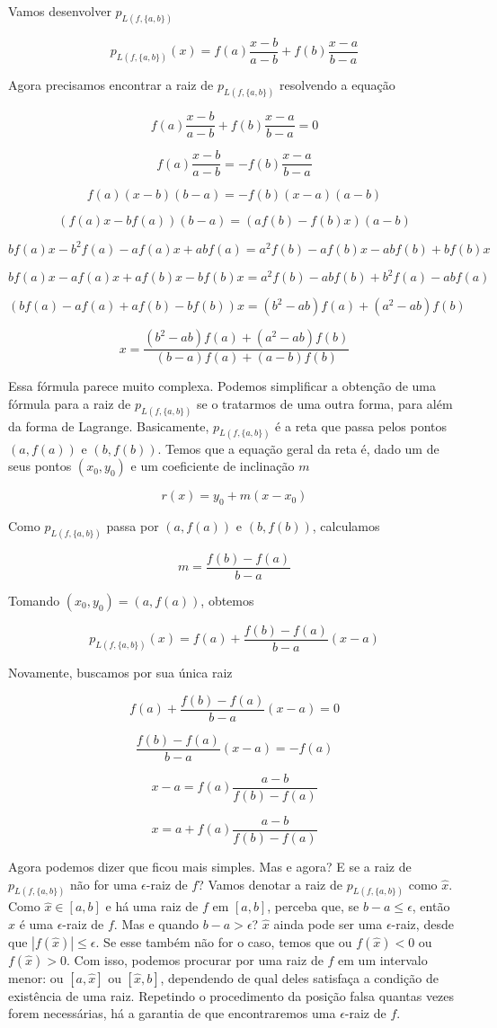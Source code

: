 \documentclass[]{article}
\numberwithin{equation}{section}
\begin{document}
Vamos desenvolver $p_{L(f, \{a, b\})}$

$$
p_{L(f, \{a, b\})}(x) = f(a) \frac{x - b}{a - b} + f(b) \frac{x - a}{b - a}
$$

Agora precisamos encontrar a raiz de $p_{L(f, \{a, b\})}$ resolvendo a
equação

$$
f(a) \frac{x - b}{a - b} + f(b) \frac{x - a}{b - a} = 0
$$

$$
f(a) \frac{x - b}{a - b} = -f(b) \frac{x - a}{b - a}
$$

$$
f(a)(x - b)(b - a) = -f(b)(x - a)(a - b)
$$

$$
(f(a)x - bf(a))(b - a) = (af(b) - f(b)x)(a - b)
$$

$$
bf(a)x - b^2f(a) - af(a)x + abf(a) = a^2f(b) - af(b)x - abf(b) + bf(b)x
$$

$$
bf(a)x - af(a)x + af(b)x - bf(b)x = a^2f(b) - abf(b) + b^2f(a) - abf(a)
$$

$$
(bf(a) - af(a) + af(b) - bf(b))x = (b^2 - ab)f(a) + (a^2 - ab)f(b)
$$

$$
x = \frac{(b^2 - ab)f(a) + (a^2 - ab)f(b)}{(b - a)f(a) + (a - b)f(b)}
$$

Essa fórmula parece muito complexa. Podemos simplificar a obtenção de
uma fórmula para a raiz de $p_{L(f, \{a, b\})}$ se o tratarmos de uma
outra forma, para além da forma de Lagrange. Basicamente,
$p_{L(f, \{a, b\})}$ é a reta que passa pelos pontos $(a, f(a))$ e
$(b, f(b))$. Temos que a equação geral da reta é, dado um de seus
pontos $(x_0, y_0)$ e um coeficiente de inclinação $m$

$$
r(x) = y_0 + m(x - x_0)
$$

Como $p_{L(f, \{a, b\})}$ passa por $(a, f(a))$ e $(b, f(b))$,
calculamos

$$
m = \frac{f(b) - f(a)}{b - a}
$$

Tomando $(x_0, y_0) = (a, f(a))$, obtemos

$$
p_{L(f, \{a, b\})}(x) = f(a) + \frac{f(b) - f(a)}{b - a}(x - a)
$$

Novamente, buscamos por sua única raiz

$$
f(a) + \frac{f(b) - f(a)}{b - a}(x - a) = 0
$$

$$
\frac{f(b) - f(a)}{b - a}(x - a) = -f(a)
$$

$$
x - a = f(a) \frac{a - b}{f(b) - f(a)}
$$

$$
x = a + f(a) \frac{a - b}{f(b) - f(a)}
$$

Agora podemos dizer que ficou mais simples. Mas e agora? E se a raiz
de $p_{L(f, \{a, b\})}$ não for uma $\epsilon$-raiz de $f$? Vamos
denotar a raiz de $p_{L(f, \{a, b\})}$ como $\hat{x}$. Como
$\hat{x} \in [a, b]$ e há uma raiz de $f$ em $[a, b]$, perceba que, se
$b - a \leq \epsilon$, então $\hat{x}$ é uma $\epsilon$-raiz de
$f$. Mas e quando $b - a > \epsilon$? $\hat{x}$ ainda pode ser uma
$\epsilon$-raiz, desde que $|f(\hat{x})| \leq \epsilon$. Se esse
também não for o caso, temos que ou $f(\hat{x}) < 0$ ou
$f(\hat{x}) > 0$. Com isso, podemos procurar por uma raiz de $f$ em um
intervalo menor: ou $[a, \hat{x}]$ ou $[\hat{x}, b]$, dependendo de
qual deles satisfaça a condição de existência de uma raiz. Repetindo o
procedimento da posição falsa quantas vezes forem necessárias, há a
garantia de que encontraremos uma $\epsilon$-raiz de $f$.
\end{document}
